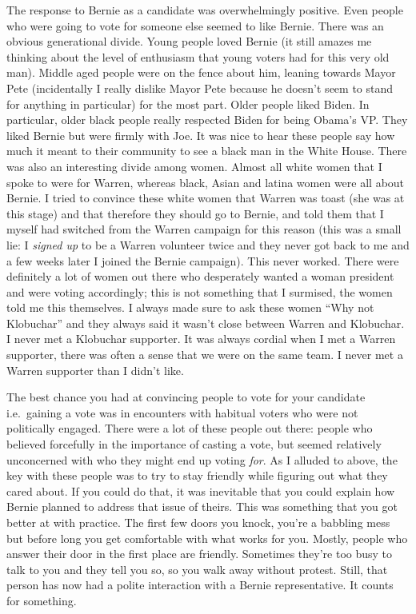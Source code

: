 \documentclass[]{book}
\begin{document}
The response to Bernie as a candidate was overwhelmingly positive. Even people who were going to vote for someone else seemed to like Bernie. There was an obvious generational divide. Young people loved Bernie (it still amazes me thinking about the level of enthusiasm that young voters had for this very old man). Middle aged people were on the fence about him, leaning towards Mayor Pete (incidentally I really dislike Mayor Pete because he doesn't seem to stand for anything in particular) for the most part. Older people liked Biden. In particular, older black people really respected Biden for being Obama's VP. They liked Bernie but were firmly with Joe. It was nice to hear these people say how much it meant to their community to see a black man in the White House. There was also an interesting divide among women. Almost all white women that I spoke to were for Warren, whereas black, Asian and latina women were all about Bernie. I tried to convince these white women that Warren was toast (she was at this stage) and that therefore they should go to Bernie, and told them that I myself had switched from the Warren campaign for this reason (this was a small lie: I \emph{signed up} to be a Warren volunteer twice and they never got back to me and a few weeks later I joined the Bernie campaign). This never worked. There were definitely a lot of women out there who desperately wanted a woman president and were voting accordingly; this is not something that I surmised, the women told me this themselves. I always made sure to ask these women ``Why not Klobuchar'' and they always said it wasn't close between Warren and Klobuchar. I never met a Klobuchar supporter. It was always cordial when I met a Warren supporter, there was often a sense that we were on the same team. I never met a Warren supporter than I didn't like.

The best chance you had at convincing people to vote for your candidate i.e.~gaining a vote was in encounters with habitual voters who were not politically engaged. There were a lot of these people out there: people who believed forcefully in the importance of casting a vote, but seemed relatively unconcerned with who they might end up voting \emph{for}. As I alluded to above, the key with these people was to try to stay friendly while figuring out what they cared about. If you could do that, it was inevitable that you could explain how Bernie planned to address that issue of theirs. This was something that you got better at with practice. The first few doors you knock, you're a babbling mess but before long you get comfortable with what works for you. Mostly, people who answer their door in the first place are friendly. Sometimes they're too busy to talk to you and they tell you so, so you walk away without protest. Still, that person has now had a polite interaction with a Bernie representative. It counts for something.
\end{document}

